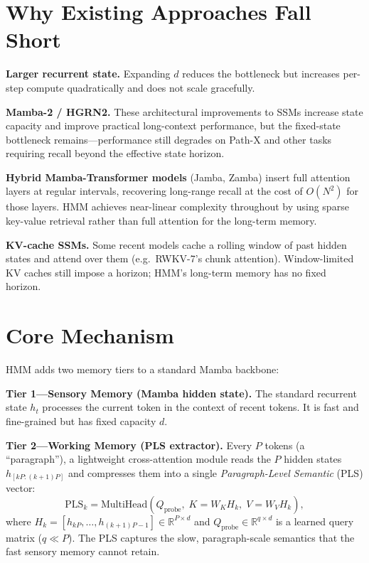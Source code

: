 \documentclass[10pt,twocolumn]{article}
\begin{document}
\section{Why Existing Approaches Fall Short}

\textbf{Larger recurrent state.} Expanding $d$ reduces the bottleneck but increases
per-step compute quadratically and does not scale gracefully.

\textbf{Mamba-2 / HGRN2.} These architectural improvements to SSMs increase state
capacity and improve practical long-context performance, but the fixed-state bottleneck
remains---performance still degrades on Path-X and other tasks requiring recall beyond
the effective state horizon.

\textbf{Hybrid Mamba-Transformer models} (Jamba, Zamba) insert full attention layers
at regular intervals, recovering long-range recall at the cost of $O(N^2)$ for those
layers. HMM achieves near-linear complexity throughout by using sparse key-value
retrieval rather than full attention for the long-term memory.

\textbf{KV-cache SSMs.} Some recent models cache a rolling window of past hidden
states and attend over them (e.g.\ RWKV-7's chunk attention). Window-limited KV
caches still impose a horizon; HMM's long-term memory has no fixed horizon.

\section{Core Mechanism}

HMM adds two memory tiers to a standard Mamba backbone:

\textbf{Tier 1---Sensory Memory (Mamba hidden state).}
The standard recurrent state $h_t$ processes the current token in the context of
recent tokens. It is fast and fine-grained but has fixed capacity $d$.

\textbf{Tier 2---Working Memory (PLS extractor).}
Every $P$ tokens (a ``paragraph''), a lightweight cross-attention module reads the
$P$ hidden states $h_{[kP:(k+1)P]}$ and compresses them into a single
\emph{Paragraph-Level Semantic} (PLS) vector:
\[
\mathrm{PLS}_k = \mathrm{MultiHead}\!\left(
  Q_{\mathrm{probe}},\;
  K = W_K H_k,\;
  V = W_V H_k
\right),
\]
where $H_k = [h_{kP}, \ldots, h_{(k+1)P-1}] \in \mathbb{R}^{P \times d}$ and
$Q_{\mathrm{probe}} \in \mathbb{R}^{q \times d}$ is a learned query matrix
($q \ll P$). The PLS captures the slow, paragraph-scale semantics that the fast
sensory memory cannot retain.
\end{document}
